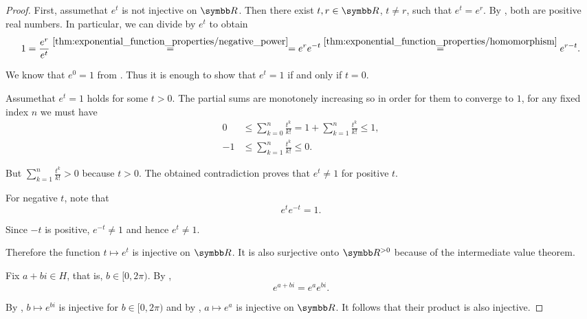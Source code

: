\begin{proof}
   First, assume\LEM that \( e^t \) is not injective on \( \BR \). Then there exist \( t, r \in \BR \), \( t \neq r \), such that \( e^t = e^r \). By , both are positive real numbers. In particular, we can divide by \( e^t \) to obtain
  \begin{equation*}
    1
    =
    \frac {e^r} {e^t}
    \overset {\ref{thm:exponential_function_properties/negative_power}} =
    =
    e^r e^{-t}
    \overset {\ref{thm:exponential_function_properties/homomorphism}} =
    e^{r - t}.
  \end{equation*}

  We know that \( e^0 = 1 \) from . Thus it is enough to show that \( e^t = 1 \) if and only if \( t = 0 \).

  Assume\LEM that \( e^t = 1 \) holds for some \( t > 0 \). The partial sums are monotonely increasing so in order for them to converge to \( 1 \), for any fixed index \( n \) we must have
  \begin{align*}
    0 &\leq \sum_{k=0}^n \frac {t^k} {k!} = 1 + \sum_{k=1}^n \frac {t^k} {k!} \leq 1,\\
    -1 &\leq \sum_{k=1}^n \frac {t^k} {k!} \leq 0.
  \end{align*}

  But \( \sum_{k=1}^n \frac {t^k} {k!} > 0 \) because \( t > 0 \). The obtained contradiction proves that \( e^t \neq 1 \) for positive \( t \).

  For negative \( t \), note that
  \begin{equation*}
    e^t e^{-t} = 1.
  \end{equation*}

  Since \( -t \) is positive, \( e^{-t} \neq 1 \) and hence \( e^t \neq 1 \).

  Therefore the function \( t \mapsto e^t \) is injective on \( \BR \). It is also surjective onto \( \BR^{>0} \) because of the intermediate value theorem.

   Fix \( a + bi \in H \), that is, \( b \in [0, 2\pi) \). By ,
  \begin{equation*}
    e^{a + bi} = e^a e^{bi}.
  \end{equation*}

  By , \( b \mapsto e^{bi} \) is injective for \( b \in [0, 2\pi) \) and by , \( a \mapsto e^a \) is injective on \( \BR \). It follows that their product is also injective.


\end{proof}
